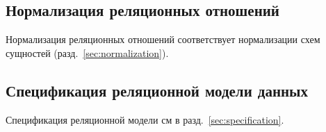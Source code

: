 \documentclass[10pt, a4paper, titlepage]{article}
\begin{document}
\subsection{Нормализация реляционных отношений}

Нормализация реляционных отношений соответствует нормализации схем сущностей (разд.~\ref{sec:normalization}).



\subsection{Спецификация реляционной модели данных}

Спецификация реляционной модели см в разд.~\ref{sec:specification}.
\end{document}

